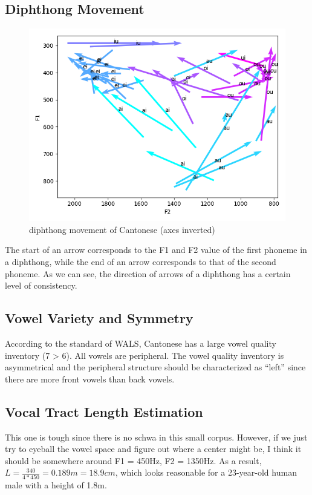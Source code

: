 \documentclass[a4paper]{article}
\begin{document}
\subsection{Diphthong Movement}
\begin{figure}[H]
    \centering
    \includegraphics[scale=0.6]{imgs/diphthong_movement.png}
    \caption{diphthong movement of Cantonese (axes inverted)}
\end{figure}
The start of an arrow corresponds to the F1 and F2 value of the first phoneme in a diphthong, while the end of an arrow corresponds to that of the second phoneme. As we can see, the direction of arrows of a diphthong has a certain level of consistency.

\subsection{Vowel Variety and Symmetry}
According to the standard of WALS, Cantonese has a large vowel quality inventory (7 > 6). All vowels are peripheral. The vowel quality inventory is asymmetrical and the peripheral structure should be characterized as ``left'' since there are more front vowels than back vowels. 

\subsection{Vocal Tract Length Estimation}
This one is tough since there is no schwa in this small corpus. However, if we just try to eyeball the vowel space and figure out where a center might be, I think it should be somewhere around F1 = 450Hz, F2 = 1350Hz. As a result, $L = \frac{340}{4 * 450} = 0.189m = 18.9cm$, which looks reasonable for a 23-year-old human male with a height of 1.8m.
\end{document}
